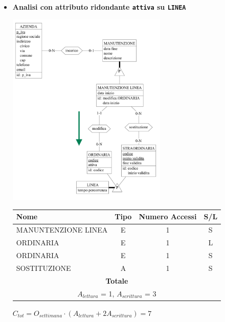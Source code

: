\documentclass[12pt,a4paper]{report}
\begin{document}
\begin{enumerate}[label=\textbf{\arabic*}]
	 \begin{itemize}
            \item \textbf{Analisi con attributo ridondante \texttt{attiva} su \texttt{LINEA}} \\
	\begin{center}
	\includegraphics[width=0.6\textwidth]{InserimentoVariazioneServizioRid}
	\end{center}
	\begin{table}[H]
	\centering
	\begin{tabular}{|l|c|c|c|}
	\hline
	Nome & Tipo & Numero Accessi & S/L \\
	\hline
	MANUNTENZIONE LINEA & E & 1 & S \\
	\hline
	ORDINARIA & E & 1 & L \\
	\hline
	ORDINARIA & E & 1 & S \\
	\hline
	SOSTITUZIONE & A & 1 & S \\
	\hline
	    \multicolumn{4}{c}{\textbf{Totale}} \\
	    \multicolumn{4}{c}{${A_{lettura}}$ = 1, ${A_{scrittura}}$ = 3} \\
	    \hline
	    \end{tabular}
	    \end{table}
	    \begin{center}
	    ${C_{tot} = {O_{settimana}}\cdot({A_{lettura}} + {2A_{scrittura}})= 7}$
	    \end{center}


\end{itemize}
\end{enumerate}
\end{document}
